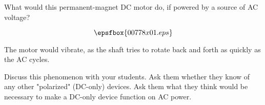 

What would this permanent-magnet DC motor do, if powered by a source of AC voltage?

$$\epsfbox{00778x01.eps}$$







The motor would vibrate, as the shaft tries to rotate back and forth as quickly as the AC cycles.







Discuss this phenomenon with your students.  Ask them whether they know of any other "polarized" (DC-only) devices.  Ask them what they think would be necessary to make a DC-only device function on AC power.




